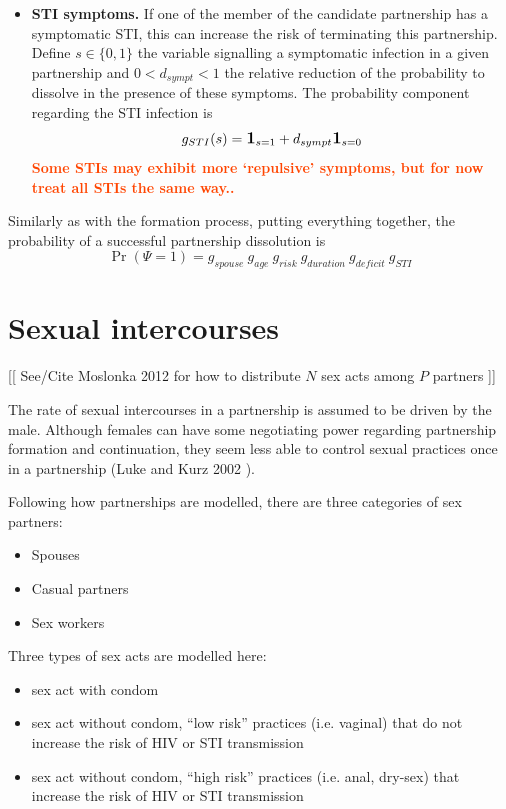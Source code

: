 \documentclass[11pt, onecolumn]{article}
\newcommand{\one}[1]{\textbf{\large{1}}_{#1}}
\newcommand{\warning}[1]{\textbf{\textcolor{OrangeRed}{#1}}}
\begin{document}
\begin{itemize}
\item \textbf{STI symptoms.}
If one of the member of the candidate partnership has a symptomatic STI, this can increase the risk of terminating this partnership.
Define $s\in\{0,1\}$ the variable signalling a symptomatic infection in a given partnership  and $0<d_{sympt}<1$ the relative reduction of the probability to dissolve in the presence of these symptoms.
The probability component regarding the STI infection is
$$ g_{STI}(s)= \one{s=1} +d_{sympt}\one{s=0}$$
\warning{Some STIs may exhibit more `repulsive' symptoms, but for now treat all STIs the same way..}

\end{itemize}

Similarly as with the formation process, putting everything together, the probability of a successful partnership dissolution is
\begin{equation}
\label{probaDissolution}
\Pr(\Psi=1) = g_{spouse}\ g_{age}\ g_{risk}\ g_{duration}\ g_{deficit}\ g_{STI}
\end{equation}




\section{Sexual intercourses}


[[ See/Cite Moslonka 2012 for how to distribute $N$ sex acts among $P$ partners ]]

The rate of sexual intercourses in a partnership is assumed to be driven by the male. Although females can have some negotiating power regarding partnership formation and continuation, they seem less able to control sexual practices once in a partnership (Luke and Kurz 2002 \cite{x}).  

Following how partnerships are modelled, there are three categories of sex partners:
\begin{itemize}
\item Spouses
\item Casual partners
\item Sex workers
\end{itemize}

Three types of sex acts are modelled here:
\begin{itemize}
\item sex act with condom
\item sex act without condom, ``low risk'' practices  (i.e. vaginal) that do not increase the risk of HIV or STI transmission
\item sex act without condom, ``high risk'' practices  (i.e. anal, dry-sex) that increase the risk of HIV or STI transmission
\end{itemize}
\end{document}
